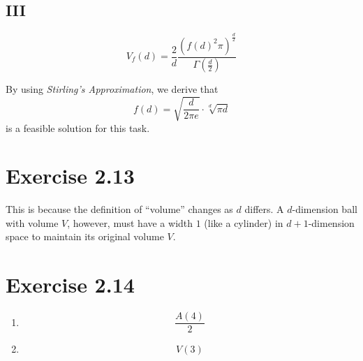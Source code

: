 \documentclass[paper=a4, fontsize=11pt]{scrartcl} %
\numberwithin{equation}{section} %
\numberwithin{figure}{section} %
\numberwithin{table}{section} %
\begin{document}
\subsection*{III}

$$V_f(d) = \frac{2}{d}\frac{\left(f(d)^2\pi\right)^{\frac{d}{2}}}{\Gamma\left(\frac{d}{2}\right)}$$

By using {\it Stirling's Approximation}, we derive that
$$f(d) = \sqrt{\frac{d}{2\pi e}}\cdot \sqrt[d]{\pi d} $$
is a feasible solution for this task.
\section*{Exercise 2.13}
This is because the definition of ``volume'' changes as $d$ differs. A $d$-dimension ball with volume $V$, however, must have a width $1$ (like a cylinder) in $d+1$-dimension space to maintain its original volume $V$.
\section*{Exercise 2.14}
\begin{enumerate}
	\item $$\frac{A(4)}{2}$$
	\item $$V(3) $$
\end{enumerate}
\end{document}
